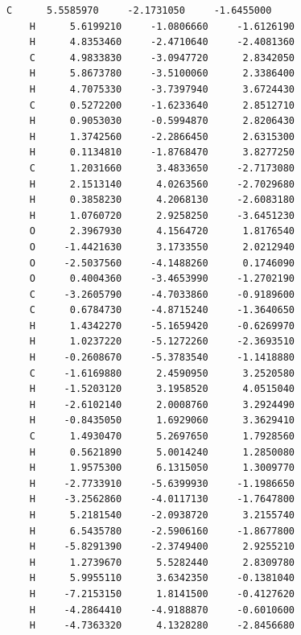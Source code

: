 \documentclass[
  digital, %
  table,   %
  lof,     %
  lot,     %
  oneside,
]{fithesis3}
\begin{document}
\begin{lstlisting}[frame=single, caption={puvodni struktura C trans },label=DescriptiveLabel]
    C      5.5585970     -2.1731050     -1.6455000
    H      5.6199210     -1.0806660     -1.6126190
    H      4.8353460     -2.4710640     -2.4081360
    C      4.9833830     -3.0947720      2.8342050
    H      5.8673780     -3.5100060      2.3386400
    H      4.7075330     -3.7397940      3.6724430
    C      0.5272200     -1.6233640      2.8512710
    H      0.9053030     -0.5994870      2.8206430
    H      1.3742560     -2.2866450      2.6315300
    H      0.1134810     -1.8768470      3.8277250
    C      1.2031660      3.4833650     -2.7173080
    H      2.1513140      4.0263560     -2.7029680
    H      0.3858230      4.2068130     -2.6083180
    H      1.0760720      2.9258250     -3.6451230
    O      2.3967930      4.1564720      1.8176540
    O     -1.4421630      3.1733550      2.0212940
    O     -2.5037560     -4.1488260      0.1746090
    O      0.4004360     -3.4653990     -1.2702190
    C     -3.2605790     -4.7033860     -0.9189600
    C      0.6784730     -4.8715240     -1.3640650
    H      1.4342270     -5.1659420     -0.6269970
    H      1.0237220     -5.1272260     -2.3693510
    H     -0.2608670     -5.3783540     -1.1418880
    C     -1.6169880      2.4590950      3.2520580
    H     -1.5203120      3.1958520      4.0515040
    H     -2.6102140      2.0008760      3.2924490
    H     -0.8435050      1.6929060      3.3629410
    C      1.4930470      5.2697650      1.7928560
    H      0.5621890      5.0014240      1.2850080
    H      1.9575300      6.1315050      1.3009770
    H     -2.7733910     -5.6399930     -1.1986650
    H     -3.2562860     -4.0117130     -1.7647800
    H      5.2181540     -2.0938720      3.2155740
    H      6.5435780     -2.5906160     -1.8677800
    H     -5.8291390     -2.3749400      2.9255210
    H      1.2739670      5.5282440      2.8309780
    H      5.9955110      3.6342350     -0.1381040
    H     -7.2153150      1.8141500     -0.4127620
    H     -4.2864410     -4.9188870     -0.6010600
    H     -4.7363320      4.1328280     -2.8456680

  \end{lstlisting}
\end{document}
